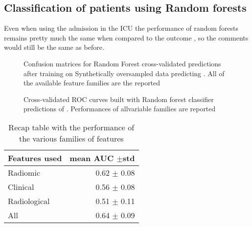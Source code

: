 \subsection{Classification of patients using Random forests}
Even when using the admission in the ICU the performance of random forests remains pretty much the same when compared to the outcome \death, so the comments would still be the same as before.

\begin{figure}[H]
\centering
	\newline
        \caption{Confusion matrices for Random Forest cross-validated predictions after training on Synthetically oversampled data predicting \icu. All of the available feature families are the reported}\label{fig:RFicu}
\end{figure}


\begin{figure}[H]
\centering
	\newline
        \caption{Cross-validated ROC curves built with Random forest classifier predictions of \death. Performances of allvariable families are reported}\label{fig:RFicuROC}
\end{figure}


\begin{table}
\caption{Recap table with the performance of the various families of features \label{tab:RecapicuRF}}
\centering
\begin{tabular}{l|r}
\toprule
Features used & mean AUC $\pm$std\\
\midrule
Radiomic  & 0.62 $\pm$ 0.08\\
Clinical  &  0.56 $\pm$ 0.08\\
Radiological & 0.51 $\pm$ 0.11\\
All & 0.64 $\pm$ 0.09\\
\bottomrule
\end{tabular}
\end{table}

